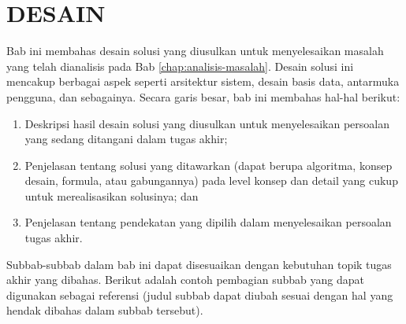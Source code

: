 
\cleardoublepage
\chapter{DESAIN}
\label{chap:desain}
Bab ini membahas desain solusi yang diusulkan untuk menyelesaikan masalah yang telah dianalisis pada Bab \ref{chap:analisis-masalah}. Desain solusi ini mencakup berbagai aspek seperti arsitektur sistem, desain basis data, antarmuka pengguna, dan sebagainya. Secara garis besar, bab ini membahas hal-hal berikut:
\begin{enumerate}[1.]
    \item Deskripsi hasil desain solusi yang diusulkan untuk menyelesaikan persoalan yang sedang ditangani dalam tugas akhir;
    \item Penjelasan tentang solusi yang ditawarkan (dapat berupa algoritma, konsep desain, formula, atau gabungannya) pada level konsep dan detail yang cukup untuk merealisasikan solusinya; dan
    \item Penjelasan tentang pendekatan yang dipilih dalam menyelesaikan persoalan tugas akhir.
\end{enumerate}
Subbab-subbab dalam bab ini dapat disesuaikan dengan kebutuhan topik tugas akhir yang dibahas. Berikut adalah contoh pembagian subbab yang dapat digunakan sebagai referensi (judul subbab dapat diubah sesuai dengan hal yang hendak dibahas dalam subbab tersebut).